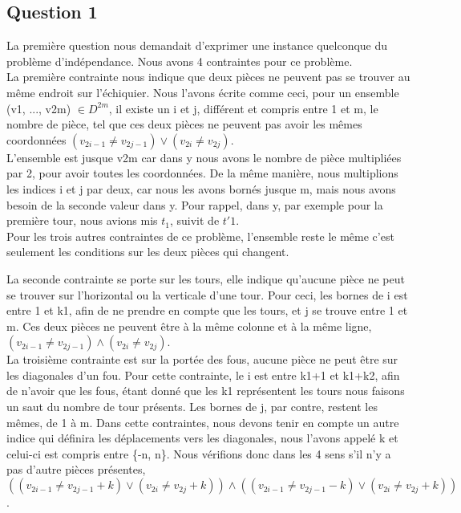 \documentclass{article}
\begin{document}
\subsection{Question 1}
La première question nous demandait d'exprimer une instance quelconque du problème d'indépendance. Nous avons 4 contraintes pour ce problème.\\

La première contrainte nous indique que deux pièces ne peuvent pas se trouver au même endroit sur l'échiquier. 
Nous l'avons écrite comme ceci, pour un ensemble (v1, ..., v2m) $\in D^{2m}$, il existe un i et j, différent et compris entre 1 et m, le nombre de pièce, tel que ces deux pièces ne peuvent pas avoir les mêmes coordonnées $(v_{2i-1} \neq v_{2j-1}) \vee  (v_{2i} \neq v_{2j})$. \\

L'ensemble est jusque v2m car dans y nous avons le nombre de pièce multipliées par 2, pour avoir toutes les coordonnées. De la même manière, nous multiplions les indices i et j par deux, car nous les avons bornés jusque m, mais nous avons besoin de la seconde valeur dans y. Pour rappel, dans y, par exemple pour la première tour, nous avions mis $t_{1}$, suivit de $t'{1}$.\\

Pour les trois autres contraintes de ce problème, l'ensemble reste le même c'est seulement les conditions sur les deux pièces qui changent. 

La seconde contrainte se porte sur les tours, elle indique qu'aucune pièce ne peut se trouver sur l'horizontal ou la verticale d'une tour. Pour ceci, les bornes de i est entre 1 et k1, afin de ne prendre en compte que les tours, et j se trouve entre 1 et m.  Ces deux pièces ne peuvent être à la même colonne et à la même ligne, $(v_{2i-1} \neq v_{2j-1}) \wedge  (v_{2i} \neq v_{2j})$.\\

La troisième contrainte est sur la portée des fous, aucune pièce ne peut être sur les diagonales d'un fou. Pour cette contrainte, le i est entre k1+1 et k1+k2, afin de n'avoir que les fous, étant donné que les k1 représentent les tours nous faisons un saut du nombre de tour présents. Les bornes de j, par contre, restent les mêmes, de 1 à m. Dans cette contraintes, nous devons tenir en compte un autre indice qui définira les déplacements vers les diagonales, nous l'avons appelé k et celui-ci est compris entre \{-n, n\}.  Nous vérifions donc dans les 4 sens s'il n'y a pas d'autre pièces présentes,
$((v_{2i-1} \neq v_{2j-1}+k) \vee  (v_{2i} \neq v_{2j}+k)) \wedge  ((v_{2i-1} \neq v_{2j-1}-k) \vee  (v_{2i} \neq v_{2j}+k))$.\\
\end{document}
